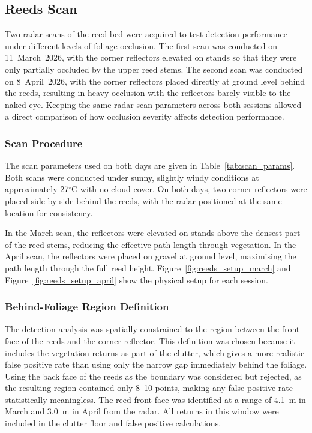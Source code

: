 
\subsection{Reeds Scan}

Two radar scans of the reed bed were acquired to test detection performance
under different levels of foliage occlusion.
The first scan was conducted on 11~March~2026, with the corner reflectors
elevated on stands so that they were only partially occluded by the upper
reed stems.
The second scan was conducted on 8~April~2026, with the corner reflectors
placed directly at ground level behind the reeds, resulting in heavy occlusion
with the reflectors barely visible to the naked eye.
Keeping the same radar scan parameters across both sessions allowed a direct
comparison of how occlusion severity affects detection performance.

\subsubsection*{Scan Procedure}

The scan parameters used on both days are given in Table~\ref{tab:scan_params}.
Both scans were conducted under sunny, slightly windy conditions at
approximately 27$^\circ$C with no cloud cover.
On both days, two corner reflectors were placed side by side behind the reeds,
with the radar positioned at the same location for consistency.

In the March scan, the reflectors were elevated on stands above the densest
part of the reed stems, reducing the effective path length through vegetation.
In the April scan, the reflectors were placed on gravel at ground level,
maximising the path length through the full reed height.
Figure~\ref{fig:reeds_setup_march} and Figure~\ref{fig:reeds_setup_april}
show the physical setup for each session.

\subsubsection*{Behind-Foliage Region Definition}

The detection analysis was spatially constrained to the region between the
front face of the reeds and the corner reflector.
This definition was chosen because it includes the vegetation returns as part
of the clutter, which gives a more realistic false positive rate than using
only the narrow gap immediately behind the foliage.
Using the back face of the reeds as the boundary was considered but rejected,
as the resulting region contained only 8--10 points, making any false positive
rate statistically meaningless.
The reed front face was identified at a range of 4.1~m in March and 3.0~m in
April from the radar.
All returns in this window were included in the clutter floor and false
positive calculations.

